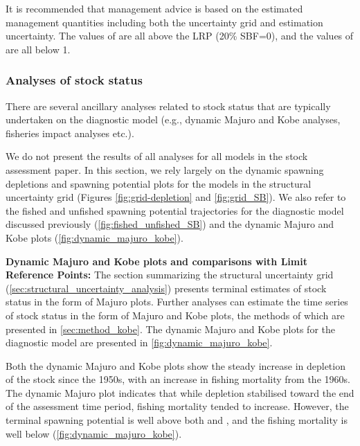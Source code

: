 It is recommended that management advice is based on the estimated management quantities including both the uncertainty grid and estimation uncertainty. The values of \sbrsbfo are all above the LRP (20\% \sbfo SBF=0), and the values of \fref are all below 1.

\subsubsection{Analyses of stock status}
\label{sec:stock_status_analysis}

There are several ancillary analyses related to stock status that are typically undertaken on the diagnostic model (e.g., dynamic Majuro and Kobe analyses, fisheries impact analyses etc.).

We do not present the results of all analyses for all models in the stock assessment paper. In this section, we rely largely on the dynamic spawning depletions and spawning potential plots for the models in the structural uncertainty grid (Figures \ref{fig:grid-depletion} and \ref{fig:grid_SB}). We also refer to the fished and unfished spawning potential trajectories for the diagnostic model discussed previously (\autoref{fig:fished_unfished_SB}) and the dynamic Majuro and Kobe plots (\autoref{fig:dynamic_majuro_kobe}).

\textbf{Dynamic Majuro and Kobe plots and comparisons with Limit Reference Points:} The section summarizing the structural uncertainty grid (\autoref{sec:structural_uncertainty_analysis}) presents terminal estimates of stock status in the form of Majuro plots. Further analyses can estimate the time series of stock status in the form of Majuro and Kobe plots, the methods of which are presented in \autoref{sec:method_kobe}. The dynamic Majuro and Kobe plots for the diagnostic model are presented in \autoref{fig:dynamic_majuro_kobe}.

Both the dynamic Majuro and Kobe plots show the steady increase in depletion of the stock since the 1950s, with an increase in fishing mortality from the 1960s. The dynamic Majuro plot indicates that while depletion stabilised toward the end of the assessment time period, fishing mortality tended to increase. However, the terminal spawning potential is well above both \sbmsy and \lrp, and the fishing mortality is well below \fmsy (\autoref{fig:dynamic_majuro_kobe}).

